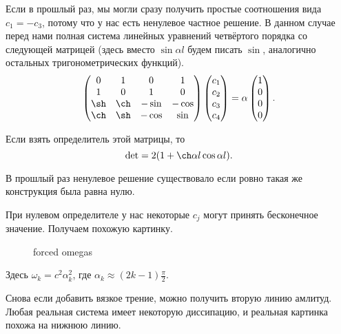 Если в прошлый раз, мы могли сразу получить простые соотношения вида $c_1 = -c_3$, потому что у нас есть ненулевое частное решение. В данном случае перед нами полная система линейных уравнений четвёртого порядка со следующей матрицей (здесь вместо $\sin\alpha l$ будем писать $\sin$, аналогично остальных тригонометрических функций).
\[
  \begin{pmatrix}
    0 & 1 & 0 & 1\\
    1 & 0 & 1 & 0\\
    \sh & \ch & -\sin & -\cos\\
    \ch & \sh & -\cos & \sin
  \end{pmatrix} \begin{pmatrix}
    c_1 \\ c_2 \\ c_3 \\ c_4
  \end{pmatrix} = \alpha\begin{pmatrix}
    1 \\ 0 \\ 0 \\ 0
  \end{pmatrix}.
\]

Если взять определитель этой матрицы, то
\[
  \det  = 2 (1 + \ch \alpha l \cos\alpha l).
\]

В прошлый раз ненулевое решение существовало если ровно такая же конструкция была равна нулю.

При нулевом определителе у нас некоторые $c_j$ могут принять бесконечное значение. Получаем похожую картинку.
\begin{figure}[H]
  \centering
  \caption{forced omegas}
  \label{fig:forcedomega}
\end{figure}
Здесь $\omega_k = c^2 \alpha^2_k$, где $\alpha_k\approx (2k - 1)\frac\pi2$.

Снова если добавить вязкое трение, можно получить вторую линию амлитуд. Любая реальная система имеет некоторую диссипацию, и реальная картинка похожа на нижнюю линию.
